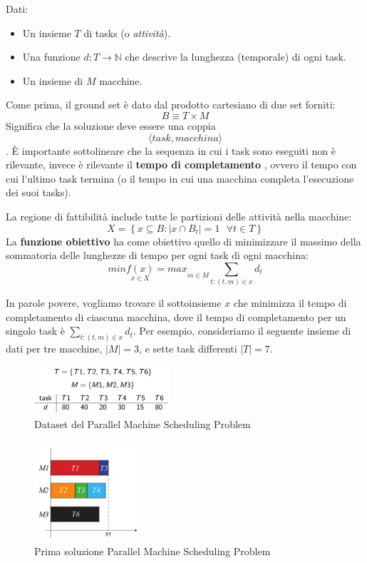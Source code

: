 \documentclass{article}
\begin{document}
Dati:
\begin{itemize}
    \item Un insieme $T$ di tasks (o \textit{attività}).
    \item Una funzione $d:T \rightarrow \mathbb{N}$ che descrive la lunghezza (temporale) di ogni task.
    \item Un insieme di $M$ macchine.
\end{itemize}

Come prima, il ground set è dato dal prodotto cartesiano di due set forniti:
$$B\equiv T\times M$$
Significa che la soluzione deve essere una coppia $$\langle task,macchina\rangle$$. È importante
sottolineare che la sequenza in cui i task sono eseguiti non è rilevante, invece è rilevante il \textbf{tempo di completamento}
, ovvero il tempo con cui l'ultimo task termina (o il tempo in cui una macchina completa l'esecuzione dei suoi tasks).

La regione di fattibilità include tutte le partizioni delle attività nella macchine:
$$X=\left\{ x\subseteq B : |x\cap B_t|=1 \text{ } \forall t \in T \right\} $$
La \textbf{funzione obiettivo} ha come obiettivo quello di minimizzare il massimo della sommatoria delle lunghezze di tempo per ogni task di ogni macchina:
$$min\underset{x\in X}{f(x)}=max\underset{m\in M}{}\sum_{t:(t,m)\in x} d_t$$

In parole povere, vogliamo trovare il sottoinsieme $x$ che minimizza il tempo di completamento di ciascuna
macchina, dove il tempo di completamento per un singolo task è $\sum_{t:(t,m)\in x} d_t$.
\newline
Per esempio, consideriamo il seguente insieme di dati per tre macchine, $|M|=3$, e sette task differenti $|T|=7$.

\begin{figure}[H]
    \centering
    \includegraphics[width=5cm]{images/dataset_PMSP.png}
    \caption{Dataset del Parallel Machine Scheduling Problem}
    \label{fig:dataset_PMSP}
\end{figure}

\begin{figure}[H]
    \centering
    \includegraphics[width=4cm]{images/sol1_PMSP.png}
    \caption{Prima soluzione Parallel Machine Scheduling Problem}
    \label{fig:sol1_PMSP}
\end{figure}
\end{document}
